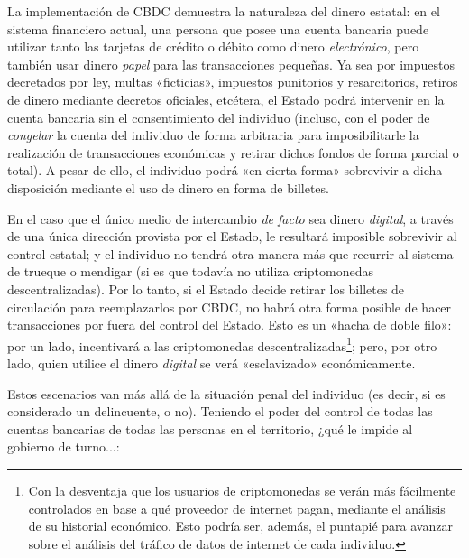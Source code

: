 \documentclass[12pt,a4paper,twoside]{book}
\begin{document}
La implementación de CBDC demuestra la naturaleza del dinero estatal: en el sistema financiero actual, una persona que posee una cuenta bancaria puede utilizar tanto las tarjetas de crédito o débito como dinero \textit{electrónico}, pero también usar dinero \textit{papel} para las transacciones pequeñas. Ya sea por impuestos decretados por ley, multas «ficticias», impuestos punitorios y resarcitorios, retiros de dinero mediante decretos oficiales, etcétera, el Estado podrá intervenir en la cuenta bancaria sin el consentimiento del individuo (incluso, con el poder de \textit{congelar} la cuenta del individuo de forma arbitraria para imposibilitarle la realización de transacciones económicas y retirar dichos fondos de forma parcial o total). A pesar de ello, el individuo podrá «en cierta forma» sobrevivir a dicha disposición mediante el uso de dinero en forma de billetes.

En el caso que el único medio de intercambio \textit{de facto} sea dinero \textit{digital}, a través de una única dirección provista por el Estado, le resultará imposible sobrevivir al control estatal; y el individuo no tendrá otra manera más que recurrir al sistema de trueque o mendigar (si es que todavía no utiliza criptomonedas descentralizadas). Por lo tanto, si el Estado decide retirar los billetes de circulación para reemplazarlos por CBDC, no habrá otra forma posible de hacer transacciones por fuera del control del Estado. Esto es un «hacha de doble filo»: por un lado, incentivará a las criptomonedas descentralizadas\footnote{Con la desventaja que los usuarios de criptomonedas se verán más fácilmente controlados en base a qué proveedor de internet pagan, mediante el análisis de su historial económico. Esto podría ser, además, el puntapié para avanzar sobre el análisis del tráfico de datos de internet de cada individuo.}; pero, por otro lado, quien utilice el dinero \textit{digital} se verá «esclavizado» económicamente.

Estos escenarios van más allá de la situación penal del individuo (es decir, si es considerado un delincuente, o no). Teniendo el poder del control de todas las cuentas bancarias de todas las personas en el territorio, ¿qué le impide al gobierno de turno...:
\end{document}
